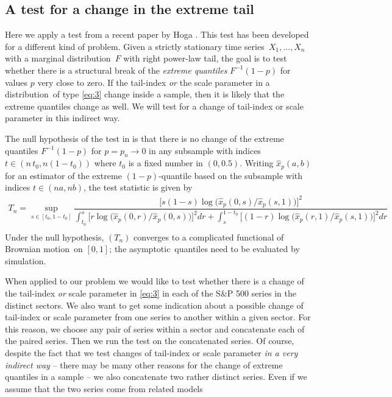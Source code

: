 \documentclass[11pt,a4]{amsart}
\newcommand{\asy}{asymptotic}
\newcommand{\ts}{time series}
\newcommand{\beam}{\begin{eqnarray}}
\newcommand{\eeam}{\end{eqnarray}\noindent}
\newcommand{\BM}{Brownian motion}
\newcommand{\fct}{function}
\newcommand{\ds}{distribution}
\newcommand{\1}{{\mathbf 1}}
\begin{document}
\subsection{A test for a change in the extreme tail}\label{sec:Hoga}
Here we apply a test from
a recent paper by Hoga \cite{hoga:2016}. This test has been developed
for a different kind of problem. Given a strictly stationary
\ts\ $X_1,\ldots,X_n$ with a marginal \ds\ $F$ with right power-law
tail, the goal is to test whether there is a structural break of the
{\em extreme quantiles} $F^{-1}(1-p)$ for values $p$ very close to
zero. If the tail-index {\em or} the scale parameter in a \ds\ of type
\eqref{eq:3} change inside a sample, then it is likely that the
extreme quantiles change as well. We will test for a change of tail-index or scale parameter in this indirect way.
\par
The null hypothesis of the test in \cite{hoga:2016} is that there is no change of the extreme quantiles $F^{-1}(1-p)$ 
for $p=p_n\to 0$ in any subsample with indices
$t\in (n\,t_0,n(1-t_0))$ where $t_0$ is a fixed number in $(0,0.5)$. Writing $\hat x_p(a,b)$ for an estimator of the extreme $(1-p)$-quantile 
based on the subsample with indices $t\in (na,nb)$, the test statistic is given by
\beam\label{eq:4}
T_n = \sup_{s \in [t_0, 1 - t_0]}
  \dfrac{  \big[s (1 - s) \log \big(\hat x_p(0, s)/\hat x_p(s, 1)\big)
    \big]^2}{
    \int_{t_0}^s\big[r \log \big( \hat x_p(0, r)/\hat x_p(0, s)
      \big)
    \big]^2 dr
    +
    \int_{s}^{1 - t_0}
    \big[
      (1 - r) \log \big(
      \hat x_p(r, 1)/
      \hat x_p(s, 1)
      \big)
    \big]^2 dr}\nonumber\\
\eeam
Under the null hypothesis, $(T_n)$ converges to a complicated \fct al of \BM\ on $[0,1]$; the \asy\ quantiles need to be 
evaluated by simulation.  
\par
When applied to our problem we would like to test 
whether there is a change of the tail-index {\em or} scale parameter in \eqref{eq:3} in each of the S\&P 500 
series in the distinct sectors. We also  want to get some indication about a possible change of tail-index or
scale parameter from one series to another within a given sector. For this reason, we choose any pair of series
within a sector and concatenate each of the paired series. Then we run the test on the concatenated series.
Of course, despite the fact that we test changes of tail-index or scale parameter 
{\em in a very indirect way} -- there may be many other reasons for the change of extreme quantiles in a sample -- 
we also concatenate two rather distinct series. Even if we assume that the two series come from related models
\end{document}
